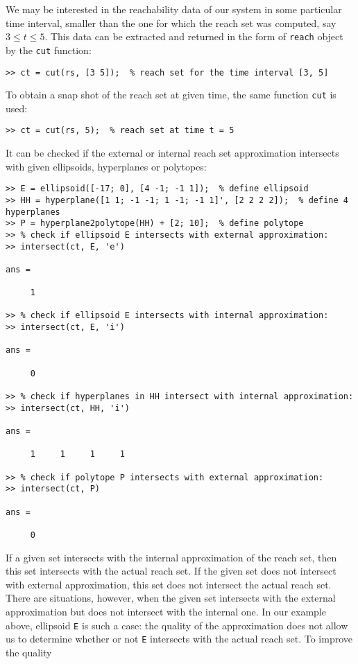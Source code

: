 We may be interested in the reachability data of our system in some
particular time interval, smaller than the one for which the reach set was
computed, say $3\leq t\leq5$.
This data can be extracted and returned in the form of {\tt reach}
object by the {\tt cut} function:
{\tt \begin{verbatim}
>> ct = cut(rs, [3 5]);  % reach set for the time interval [3, 5]
\end{verbatim} }
To obtain a snap shot of the reach set at given time, the same function
{\tt cut} is used:
{\tt \begin{verbatim}
>> ct = cut(rs, 5);  % reach set at time t = 5
\end{verbatim} }
It can be checked if the external or internal reach set approximation
intersects with given ellipsoids, hyperplanes or polytopes:
{\tt \begin{verbatim}
>> E = ellipsoid([-17; 0], [4 -1; -1 1]);  % define ellipsoid
>> HH = hyperplane([1 1; -1 -1; 1 -1; -1 1]', [2 2 2 2]);  % define 4 hyperplanes
>> P = hyperplane2polytope(HH) + [2; 10];  % define polytope
>> % check if ellipsoid E intersects with external approximation:
>> intersect(ct, E, 'e')

ans =

     1

>> % check if ellipsoid E intersects with internal approximation:
>> intersect(ct, E, 'i')

ans =

     0

>> % check if hyperplanes in HH intersect with internal approximation:
>> intersect(ct, HH, 'i')

ans =

     1     1     1     1

>> % check if polytope P intersects with external approximation:
>> intersect(ct, P)

ans =

     0
\end{verbatim} }
If a given set intersects with the internal approximation of the reach set,
then this set intersects with the actual reach set.
If the given set does not
intersect with external approximation, this set does not
intersect the actual reach set. There are situations, however, when the
given set intersects with the external approximation but does not intersect
with the internal one. In our example above, ellipsoid {\tt E} is such a case:
the quality of the approximation does not allow us to determine whether or not
{\tt E} intersects with the actual reach set. To improve the quality

